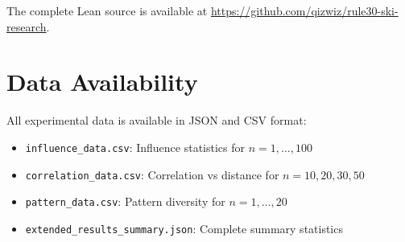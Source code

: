 \documentclass[11pt]{article}
\begin{document}
The complete Lean source is available at \url{https://github.com/qizwiz/rule30-ski-research}.

\section{Data Availability}

All experimental data is available in JSON and CSV format:
\begin{itemize}
    \item \texttt{influence\_data.csv}: Influence statistics for $n=1,\ldots,100$
    \item \texttt{correlation\_data.csv}: Correlation vs distance for $n=10,20,30,50$
    \item \texttt{pattern\_data.csv}: Pattern diversity for $n=1,\ldots,20$
    \item \texttt{extended\_results\_summary.json}: Complete summary statistics
\end{itemize}
\end{document}
